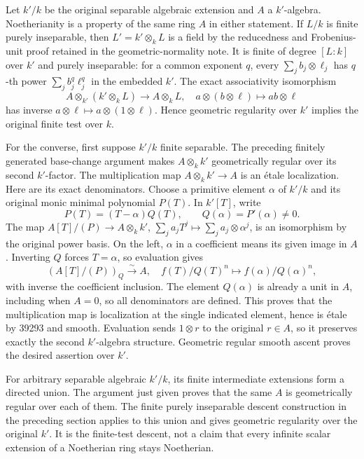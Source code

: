 Let \(k'/k\) be the original separable algebraic extension and \(A\) a \(k'\)-algebra. Noetherianity is a property of the same ring \(A\) in either statement. If \(L/k\) is finite purely inseparable, then \(L'=k'\otimes_kL\) is a field by the reducedness and Frobenius-unit proof retained in the geometric-normality note. It is finite of degree \([L:k]\) over \(k'\) and purely inseparable: for a common exponent \(q\), every \(\sum_jb_j\otimes\ell_j\) has \(q\)-th power \(\sum_jb_j^q\ell_j^q\) in the embedded \(k'\). The exact associativity isomorphism \[
 A\otimes_{k'}(k'\otimes_kL)\longrightarrow A\otimes_kL,
 \quad a\otimes(b\otimes\ell)\longmapsto ab\otimes\ell
\] has inverse \(a\otimes\ell\mapsto a\otimes(1\otimes\ell)\). Hence geometric regularity over \(k'\) implies the original finite test over \(k\).

For the converse, first suppose \(k'/k\) finite separable. The preceding finitely generated base-change argument makes \(A\otimes_kk'\) geometrically regular over its second \(k'\)-factor. The multiplication map \(A\otimes_kk'\to A\) is an étale localization. Here are its exact denominators. Choose a primitive element \(\alpha\) of \(k'/k\) and its original monic minimal polynomial \(P(T)\). In \(k'[T]\), write \[
 P(T)=(T-\alpha)Q(T),\qquad Q(\alpha)=P'(\alpha)\ne0.
\] The map \(A[T]/(P)\to A\otimes_kk'\), \(\sum_j a_jT^j\mapsto\sum_j a_j\otimes\alpha^j\), is an isomorphism by the original power basis. On the left, \(\alpha\) in a coefficient means its given image in \(A\). Inverting \(Q\) forces \(T=\alpha\), so evaluation gives \[
 (A[T]/(P))_Q\xrightarrow{\sim}A,
 \quad f(T)/Q(T)^n\longmapsto f(\alpha)/Q(\alpha)^n,
\] with inverse the coefficient inclusion. The element \(Q(\alpha)\) is already a unit in \(A\), including when \(A=0\), so all denominators are defined. This proves that the multiplication map is localization at the single indicated element, hence is étale by 39293 and smooth. Evaluation sends \(1\otimes r\) to the original \(r\in A\), so it preserves exactly the second \(k'\)-algebra structure. Geometric regular smooth ascent proves the desired assertion over \(k'\).

For arbitrary separable algebraic \(k'/k\), its finite intermediate extensions form a directed union. The argument just given proves that the same \(A\) is geometrically regular over each of them. The finite purely inseparable descent construction in the preceding section applies to this union and gives geometric regularity over the original \(k'\). It is the finite-test descent, not a claim that every infinite scalar extension of a Noetherian ring stays Noetherian.

